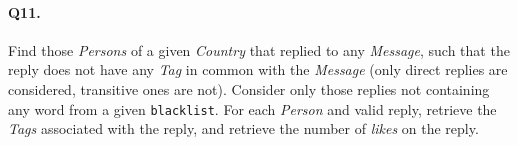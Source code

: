 \paragraph{Q11.}
Find those \emph{Persons} of a given \emph{Country} that replied to any
\emph{Message}, such that the reply does not have any \emph{Tag} in
common with the \emph{Message} (only direct replies are considered,
transitive ones are not). Consider only those replies not containing any
word from a given \texttt{blacklist}. For each \emph{Person} and valid
reply, retrieve the \emph{Tags} associated with the reply, and retrieve
the number of \emph{likes} on the reply.
